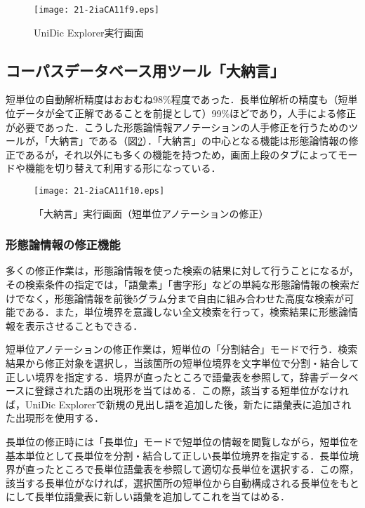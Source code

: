 \documentclass[japanese]{jnlp_1.4}
\begin{document}
\begin{figure}[t]
\begin{center}
\texttt{[image: 21-2iaCA11f9.eps]}
\end{center}
\caption{UniDic Explorer実行画面}
\label{fig9}
\end{figure}


\subsection{コーパスデータベース用ツール「大納言」}

短単位の自動解析精度はおおむね98\%程度であった．長単位解析の精度も（短単位データが全て正解であることを前提として）99\%ほどであり，人手による修正が必要であった．こうした形態論情報アノテーションの人手修正を行うためのツールが，「大納言」である（図\ref{fig10}）．「大納言」の中心となる機能は形態論情報の修正であるが，それ以外にも多くの機能を持つため，画面上段のタブによってモードや機能を切り替えて利用する形になっている．

\begin{figure}[t]
\begin{center}
\texttt{[image: 21-2iaCA11f10.eps]}
\end{center}
\caption{「大納言」実行画面（短単位アノテーションの修正）}
\label{fig10}
\end{figure}


\subsubsection*{形態論情報の修正機能}

多くの修正作業は，形態論情報を使った検索の結果に対して行うことになるが，その検索条件の指定では，「語彙素」「書字形」などの単純な形態論情報の検索だけでなく，形態論情報を前後5グラム分まで自由に組み合わせた高度な検索が可能である．また，単位境界を意識しない全文検索を行って，検索結果に形態論情報を表示させることもできる．

短単位アノテーションの修正作業は，短単位の「分割結合」モードで行う．検索結果から修正対象を選択し，当該箇所の短単位境界を文字単位で分割・結合して正しい境界を指定する．境界が直ったところで語彙表を参照して，辞書データベースに登録された語の出現形を当てはめる．この際，該当する短単位がなければ，UniDic Explorerで新規の見出し語を追加した後，新たに語彙表に追加された出現形を使用する．

長単位の修正時には「長単位」モードで短単位の情報を閲覧しながら，短単位を基本単位として長単位を分割・結合して正しい長単位境界を指定する．長単位境界が直ったところで長単位語彙表を参照して適切な長単位を選択する．この際，該当する長単位がなければ，選択箇所の短単位から自動構成される長単位をもとにして長単位語彙表に新しい語彙を追加してこれを当てはめる．
\end{document}
